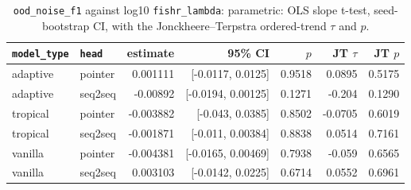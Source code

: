 \documentclass[10pt]{article}
\begin{document}
{\small
\begin{longtable}{llrrrrr}
\caption{\texttt{ood\_noise\_f1} against log10 \texttt{fishr\_lambda}: parametric: OLS slope t-test, seed-bootstrap CI, with the Jonckheere--Terpstra ordered-trend $\tau$ and $p$.}\label{tab:trend-ood_noise_f1}\\
\toprule
\texttt{model\_type} & \texttt{head} & estimate & 95\% CI & $p$ & JT $\tau$ & JT $p$\\
\midrule
\endhead
adaptive & pointer & 0.001111 & [-0.0117, 0.0125] & 0.9518 & 0.0895 & 0.5175\\
adaptive & seq2seq & -0.00892 & [-0.0194, 0.00125] & 0.1271 & -0.204 & 0.1290\\
tropical & pointer & -0.003882 & [-0.043, 0.0385] & 0.8502 & -0.0705 & 0.6019\\
tropical & seq2seq & -0.001871 & [-0.011, 0.00384] & 0.8838 & 0.0514 & 0.7161\\
vanilla & pointer & -0.004381 & [-0.0165, 0.00469] & 0.7938 & -0.059 & 0.6565\\
vanilla & seq2seq & 0.003103 & [-0.0142, 0.0225] & 0.6714 & 0.0552 & 0.6961\\
\bottomrule
\end{longtable}
}
\end{document}
